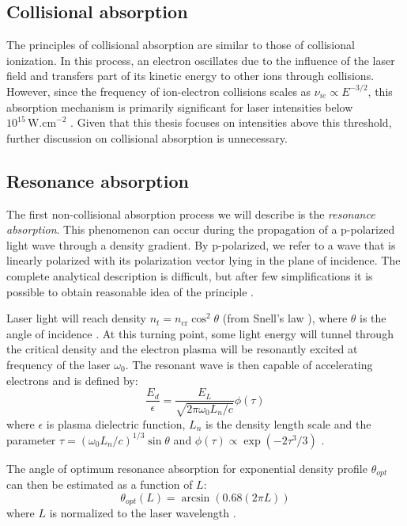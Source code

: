 \subsection*{Collisional absorption}
The principles of collisional absorption are similar to those of collisional ionization. In this process, an electron oscillates due to the influence of the laser field and transfers part of its kinetic energy to other ions through collisions. However, since the frequency of ion-electron collisions scales as $\nu_{ie} \propto E^{-3/2}$, this absorption mechanism is primarily significant for laser intensities below $10^{15}\,\mathrm{W.cm}^{-2}$ \cite{absorption1}. Given that this thesis focuses on intensities above this threshold, further discussion on collisional absorption is unnecessary.

\subsection*{Resonance absorption}
The first non-collisional absorption process we will describe is the \textit{resonance absorption}. This phenomenon can occur during the propagation of a p-polarized light wave through a density gradient. By p-polarized, we refer to a wave that is linearly polarized with its polarization vector lying in the plane of incidence. The complete analytical description is difficult, but after few simplifications it is possible to obtain reasonable idea of the principle \cite{laser-plasma6}. 

Laser light will reach density $n_t = n_{\mathrm{cr}}\cos^2\theta$ (from Snell's law \cite{absorption2}), where $\theta$ is the angle of incidence \cite{laser-plasma6}. At this turning point, some light energy will tunnel through the critical density and the electron plasma will be resonantly excited at frequency of the laser $\omega_0$. The resonant wave is then capable of accelerating electrons and is defined by:
\begin{equation}
	\label{eq:resonance}
	\frac{E_d}{\epsilon} = \frac{E_L}{\sqrt{2\pi\omega_0 L_n/c}}\phi\left(\tau\right)
\end{equation}
where $\epsilon$ is plasma dielectric function, $L_n$ is the density length scale and the parameter $\tau= \left(\omega_0 L_n/c\right)^{1/3}\sin\theta$ and $\phi\left(\tau\right) \propto \exp\left(-2\tau^3/3\right)$ \cite{absorption2,laser-plasma6}.

The angle of optimum resonance absorption for exponential density profile $\theta_{opt}$ can then be estimated as a function of $L$:
\begin{equation}
	\theta_{opt}\left(L\right) = \arcsin\left(0.68(2\pi L)\right)
\end{equation}
where $L$ is normalized to the laser wavelength \cite{absorption1}.


